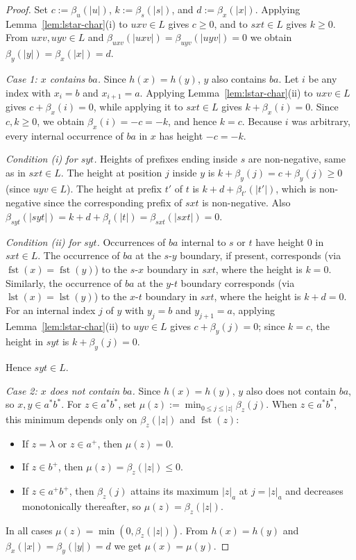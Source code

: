 \documentclass[11pt,a4paper]{article}
\begin{document}
\begin{proof}
Set $c:=\beta_u(|u|)$, $k:=\beta_s(|s|)$, and $d:=\beta_x(|x|)$.
Applying Lemma~\ref{lem:lstar-char}\textup{(i)} to $uxv\in L$ gives
$c\ge 0$, and to $sxt\in L$ gives $k\ge 0$.
From $uxv,uyv\in L$ and $\beta_{uxv}(|uxv|)=\beta_{uyv}(|uyv|)=0$ we
obtain $\beta_y(|y|)=\beta_x(|x|)=d$.

\smallskip
\noindent\emph{Case 1: $x$ contains $ba$.}
Since $h(x)=h(y)$, $y$ also contains $ba$.
Let $i$ be any index with $x_i=b$ and $x_{i+1}=a$.
Applying Lemma~\ref{lem:lstar-char}\textup{(ii)} to $uxv\in L$ gives
$c+\beta_x(i)=0$, while applying it to $sxt\in L$ gives
$k+\beta_x(i)=0$.
Since $c,k\ge 0$, we obtain $\beta_x(i)=-c=-k$, and hence $k=c$.
Because $i$ was arbitrary, every internal occurrence of $ba$ in $x$
has height $-c=-k$.

\emph{Condition \textup{(i)} for $syt$.}
Heights of prefixes ending inside $s$ are non-negative, same as in
$sxt\in L$.
The height at position $j$ inside $y$ is
$k+\beta_y(j)=c+\beta_y(j)\ge 0$ (since $uyv\in L$).
The height at prefix $t'$ of $t$ is $k+d+\beta_{t'}(|t'|)$, which is
non-negative since the corresponding prefix of $sxt$ is non-negative.
Also $\beta_{syt}(|syt|)=k+d+\beta_t(|t|)=\beta_{sxt}(|sxt|)=0$.

\emph{Condition \textup{(ii)} for $syt$.}
Occurrences of $ba$ internal to $s$ or $t$ have height $0$ in
$sxt\in L$.
The occurrence of $ba$ at the $s$-$y$ boundary, if present, corresponds
(via $\operatorname{fst}(x)=\operatorname{fst}(y)$) to the $s$-$x$
boundary in $sxt$, where the height is $k=0$.
Similarly, the occurrence of $ba$ at the $y$-$t$ boundary corresponds
(via $\operatorname{lst}(x)=\operatorname{lst}(y)$) to the $x$-$t$
boundary in $sxt$, where the height is $k+d=0$.
For an internal index $j$ of $y$ with $y_j=b$ and $y_{j+1}=a$,
applying Lemma~\ref{lem:lstar-char}\textup{(ii)} to $uyv\in L$ gives
$c+\beta_y(j)=0$; since $k=c$, the height in $syt$ is
$k+\beta_y(j)=0$.

Hence $syt\in L$.

\smallskip
\noindent\emph{Case 2: $x$ does not contain $ba$.}
Since $h(x)=h(y)$, $y$ also does not contain $ba$, so
$x,y\in a^*b^*$.
For $z\in a^*b^*$, set $\mu(z):=\min_{0\le j\le|z|}\beta_z(j)$.
When $z\in a^*b^*$, this minimum depends only on $\beta_z(|z|)$ and
$\operatorname{fst}(z)$:
\begin{itemize}[nosep]
\item If $z=\lambda$ or $z\in a^+$, then $\mu(z)=0$.
\item If $z\in b^+$, then $\mu(z)=\beta_z(|z|)\le 0$.
\item If $z\in a^+b^+$, then $\beta_z(j)$ attains its maximum $|z|_a$
      at $j=|z|_a$ and decreases monotonically thereafter, so
      $\mu(z)=\beta_z(|z|)$.
\end{itemize}
In all cases $\mu(z)=\min(0,\beta_z(|z|))$.
From $h(x)=h(y)$ and $\beta_x(|x|)=\beta_y(|y|)=d$ we get
$\mu(x)=\mu(y)$.


\end{proof}
\end{document}
